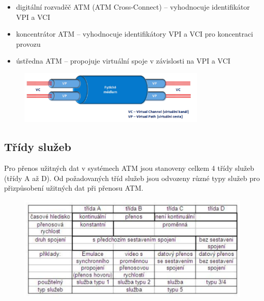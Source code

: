 \begin{itemize}
    \item digitální rozvaděč ATM (ATM Cross-Connect) -- vyhodnocuje identifikátor VPI a VCI
    \item koncentrátor ATM -- vyhodnocuje identifikátory VPI a VCI pro koncentraci provozu
    \item ústředna ATM -- propojuje virtuální spoje v závislosti na VPI a VCI
\end{itemize}

\begin{figure} [h]
    \centering
    \includegraphics[width=0.8\textwidth]{snimky/VC.png}
    \label{fig:uml}
\end{figure}

\subsection{Třídy služeb}
Pro přenos užitných dat v systémech ATM jsou stanoveny celkem 4 třídy služeb (třídy A až D). Od požadovaných tříd služeb jsou odvozeny různé typy služeb pro přizpůsobení užitných dat při přenosu ATM.

\begin{figure}[h]
    \centering
    \includegraphics[scale=0.6]{snimky/sluzby.png}
\end{figure}
\newpage

